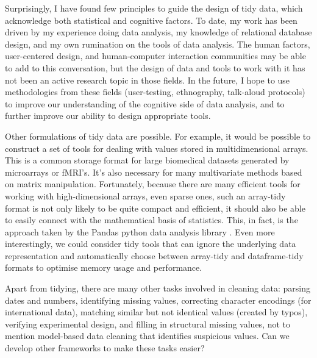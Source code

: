 \documentclass[article]{jss}
\begin{document}
Surprisingly, I have found few principles to guide the design of tidy data, which acknowledge both statistical and cognitive factors. To date, my work has been driven by my experience doing data analysis, my knowledge of relational database design, and my own rumination on the tools of data analysis. The human factors, user-centered design, and human-computer interaction communities may be able to add to this conversation, but the design of data and tools to work with it has not been an active research topic in those fields. In the future, I hope to use methodologies from these fields (user-testing, ethnography, talk-aloud protocols) to improve our understanding of the cognitive side of data analysis, and to further improve our ability to design appropriate tools.

Other formulations of tidy data are possible. For example, it would be possible to construct a set of tools for dealing with values stored in multidimensional arrays. This is a common storage format for large biomedical datasets generated by microarrays or fMRI's. It's also necessary for many multivariate methods based on matrix manipulation. Fortunately, because there are many efficient tools for working with high-dimensional arrays, even sparse ones, such an array-tidy format is not only likely to be quite compact and efficient, it should also be able to easily connect with the mathematical basis of statistics. This, in fact, is the approach taken by the Pandas python data analysis library \citep{mckinney:2010}. Even more interestingly, we could consider tidy tools that can ignore the underlying data representation and automatically choose between array-tidy and dataframe-tidy formats to optimise memory usage and performance.

Apart from tidying, there are many other tasks involved in cleaning data: parsing dates and numbers, identifying missing values, correcting character encodings (for international data), matching similar but not identical values (created by typos), verifying experimental design, and filling in structural missing values, not to mention model-based data cleaning that identifies suspicious values. Can we develop other frameworks to make these tasks easier?

\end{document}
